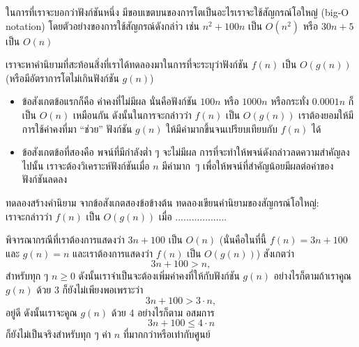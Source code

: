 ใน{\wbr}การ{\wbr}ที่{\wbr}เรา{\wbr}จะ{\wbr}บอก{\wbr}ว่า{\wbr}ฟังก์ชัน{\wbr}หนึ่ง มี{\wbr}ขอบเขต{\wbr}บน{\wbr}ของ{\wbr}การ{\wbr}โต{\wbr}เป็น{\wbr}อะไร{\wbr}เรา{\wbr}จะ{\wbr}ใช้{\wbr}สัญกรณ์{\wbr}โอ{\wbr}ใหญ่{\wbr}
(big-O notation) โดย{\wbr}ตัวอย่าง{\wbr}ของ{\wbr}การ{\wbr}ใช้{\wbr}สัญกรณ์{\wbr}ดัง{\wbr}กล่า่ว เช่น $n^2 + 100n$ เป็น{\wbr}
$O(n^2)$ หรือ $30n + 5$ เป็น $O(n)$ 

เรา{\wbr}จะ{\wbr}หา{\wbr}คำ{\wbr}นิยาม{\wbr}ที่{\wbr}สะท้อน{\wbr}สิ่ง{\wbr}ที่{\wbr}เรา{\wbr}ได้{\wbr}ทดลอง{\wbr}มา{\wbr}ใน{\wbr}การ{\wbr}ที่{\wbr}จะ{\wbr}ระบุ{\wbr}ว่า{\wbr}ฟังก์ชัน $f(n)$ เป็น{\wbr}
$O(g(n))$ (หรือ{\wbr}มี{\wbr}อัตรา{\wbr}การ{\wbr}โต{\wbr}ไม่{\wbr}เกิน{\wbr}ฟังก์ชัน $g(n)$)
\begin{itemize}
\item ข้อสังเกต{\wbr}ข้อ{\wbr}แรก{\wbr}ก็{\wbr}คือ ค่าคงที่{\wbr}ไม่{\wbr}มี{\wbr}ผล นั่น{\wbr}คือ{\wbr}ฟังก์ชัน $100n$ หรือ $1000n$ หรือ{\wbr}กระทั่ง{\wbr}
  $0.0001n$ ก็{\wbr}เป็น $O(n)$ เหมือน{\wbr}กัน ดังนั้น{\wbr}ใน{\wbr}การ{\wbr}จะ{\wbr}กล่าว{\wbr}ว่า $f(n)$ เป็น $O(g(n))$
  เรา{\wbr}ต้อง{\wbr}ยอม{\wbr}ให้{\wbr}มี{\wbr}การ{\wbr}ใช้{\wbr}ค่าคงที่{\wbr}มา ``ช่วย'' ฟังก์ชัน $g(n)$
  ให้{\wbr}มี{\wbr}ค่า{\wbr}มาก{\wbr}ขึ้น{\wbr}จน{\wbr}เปรียบเทียบ{\wbr}กับ $f(n)$ ได้{\wbr}
\item ข้อสังเกต{\wbr}ข้อ{\wbr}ที่{\wbr}สอง{\wbr}คือ พจน์{\wbr}ที่{\wbr}มี{\wbr}กำลัง{\wbr}ต่ำ ๆ จะ{\wbr}ไม่{\wbr}มี{\wbr}ผล{\wbr}
  การ{\wbr}ที่{\wbr}จะ{\wbr}ทำ{\wbr}ให้{\wbr}พจน์{\wbr}ดังกล่าว{\wbr}ลด{\wbr}ความ{\wbr}สำคัญ{\wbr}ลง{\wbr}ไป{\wbr}นั้น เรา{\wbr}จะ{\wbr}ต้อง{\wbr}วิเคราะห์{\wbr}ฟังก์ชัน{\wbr}เมื่อ $n$
  มี{\wbr}ค่า{\wbr}มาก~ๆ เพื่อให้{\wbr}พจน์{\wbr}ที่{\wbr}สำคัญ{\wbr}น้อย{\wbr}มี{\wbr}ผล{\wbr}ต่อ{\wbr}ค่า{\wbr}ของ{\wbr}ฟังก์ชัน{\wbr}ลด{\wbr}ลง{\wbr}
\end{itemize}

\begin{quiz}{ทดลอง{\wbr}สร้าง{\wbr}คำ{\wbr}นิยาม}
จาก{\wbr}ข้อสังเกต{\wbr}สอง{\wbr}ข้อ{\wbr}ข้างต้น ทดลอง{\wbr}เขียน{\wbr}คำ{\wbr}นิยาม{\wbr}ของ{\wbr}สัญกรณ์{\wbr}โอ{\wbr}ใหญ่: \\
เรา{\wbr}จะ{\wbr}กล่าว{\wbr}ว่า $f(n)$ เป็น $O(g(n))$ เมื่อ ...................
\end{quiz}

พิจารณา{\wbr}กรณี{\wbr}ที่{\wbr}เรา{\wbr}ต้องการ{\wbr}แสดง{\wbr}ว่า $3n+100$ เป็น $O(n)$ (นั่น{\wbr}คือ{\wbr}ใน{\wbr}ที่นี้ $f(n)=3n+100$
และ $g(n)=n$ และ{\wbr}เรา{\wbr}ต้องการ{\wbr}แสดง{\wbr}ว่า $f(n)$ เป็น $O(g(n))$) สังเกต{\wbr}ว่า{\wbr}
\[
3n + 100 > n,
\]
สำหรับ{\wbr}ทุก ๆ $n\geq 0$ ดังนั้น{\wbr}เรา{\wbr}จำเป็น{\wbr}จะ{\wbr}ต้อง{\wbr}เพิ่ม{\wbr}ค่าคงที่{\wbr}ให้{\wbr}กับ{\wbr}ฟังก์ชัน $g(n)$
อย่างไรก็ตาม{\wbr}ถ้า{\wbr}เรา{\wbr}คูณ $g(n)$ ด้วย 3 ก็{\wbr}ยัง{\wbr}ไม่{\wbr}เพียงพอ{\wbr}เพราะว่า{\wbr}
\[
3n + 100 > 3\cdot n,
\]
อยู่{\wbr}ดี  ดังนั้น{\wbr}เรา{\wbr}จะ{\wbr}คูณ $g(n)$ ด้วย 4  อย่างไรก็ตาม อสมการ{\wbr}
\[
3n + 100 \leq 4\cdot n
\]
ก็{\wbr}ยัง{\wbr}ไม่{\wbr}เป็นจริง{\wbr}สำหรับ{\wbr}ทุก ๆ ค่า $n$ ที่มา{\wbr}กก{\wbr}ว่า{\wbr}หรือ{\wbr}เท่า{\wbr}กับ{\wbr}ศูนย์{\wbr}

